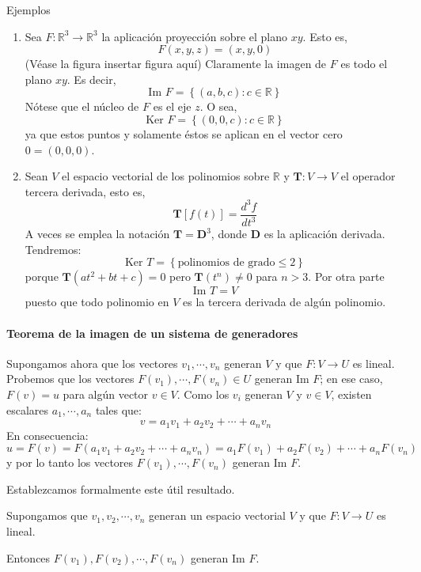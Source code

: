 Ejemplos
\label{ej:ejemplos_a_revisar}
\begin{enumerate}[label=\alph*.]
  \item Sea \(F:\mathbb{R}^3 \rightarrow \mathbb{R}^3\) la aplicación proyección sobre el plano \(xy\). Esto es,
  \[
    F(x,y,z)=(x,y,0)
  \]
  (Véase la figura {insertar figura aquí}) Claramente la imagen de \(F\) es todo el plano \(xy\). Es decir, 
  \[
    \text{Im } F = \left\{(a,b,c):c\in \mathbb{R}\right\}
  \]
  Nótese que el núcleo de \(F\) es el eje \(z\). O sea,
  \[
    \text{Ker } F = \left\{(0,0,c):c\in \mathbb{R}\right\}
  \]
  ya que estos puntos y solamente éstos se aplican en el vector cero \(0=(0,0,0)\).
  \item Sean \(V\) el espacio vectorial de los polinomios sobre \(\mathbb{R}\) y \(\mathbf{T}:V\rightarrow V\) el operador tercera derivada, esto es,
  \[
    \mathbf{T}\left[f(t)\right] = \frac{d^3 f}{dt^3}
  \]
  A veces se emplea la notación \(\mathbf{T}=\mathbf{D}^3\), donde \(\mathbf{D}\) es la aplicación derivada. Tendremos:
  \[
    \text{Ker } T = \left\{\text{polinomios de grado} \leq 2\right\}
  \]
  porque \(\mathbf{T}(at^2+bt+c)=0\) pero \(\mathbf{T}(t^n)\neq 0\) para \(n > 3\). Por otra parte
  \[
    \text{Im } T = V
  \]
  puesto que todo polinomio en \(V\) es la tercera derivada de algún polinomio.
\end{enumerate}

\paragraph{Teorema de la imagen de un sistema de generadores}

Supongamos ahora que los vectores \(v_1, \cdots, v_n\) generan \(V\) y que \(F:V\rightarrow U\) es lineal. Probemos que los vectores \(F(v_1),\cdots, F(v_n)\in U\) generan \(\text{Im } F\); en ese caso, \(F(v)=u\) para algún vector \(v\in V\). Como los \(v_i\) generan \(V\) y \(v \in V\), existen escalares \(a_1, \cdots, a_n\) tales que:
\[
  v = a_1 v_1 + a_2 v_2 + \cdots + a_n v_n
\]  
En consecuencia:
\[
  u = F(v) = F(a_1 v_1 + a_2 v_2 + \cdots + a_n v_n) = a_1 F(v_1) + a_2 F(v_2) + \cdots + a_n F(v_n)
\]
y por lo tanto los vectores \(F(v_1), \cdots , F(v_n)\) generan \(\text{Im } F\).

Establezcamos formalmente este útil resultado.

Supongamos que \(v_1, v_2, \cdots, v_n\) generan un espacio vectorial \(V\) y que \(F:V\rightarrow U\) es lineal.

Entonces \(F(v_1), F(v_2), \cdots, F(v_n)\) generan \(\text{Im } F\).

